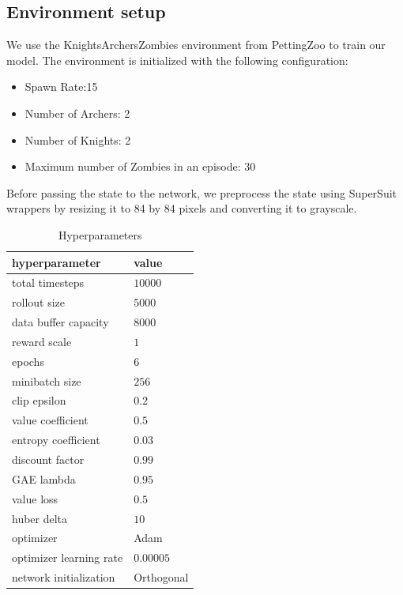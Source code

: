 \documentclass{article}
\begin{document}

\subsection{Environment setup}
We use the KnightsArchersZombies environment from PettingZoo to train our model. The environment is initialized with
the following configuration:
\begin{itemize}
  \item Spawn Rate:15
  \item Number of Archers: 2
  \item Number of Knights: 2
  \item Maximum number of Zombies in an episode: 30
\end{itemize}

Before passing the state to the network, we preprocess the state using SuperSuit \cite{SuperSuit} wrappers by resizing it to 84 by 84 pixels and
converting it to grayscale.


\begin{table}[h]
  \caption{Hyperparameters}
   \centering
   \begin{tabular}{ll}
     \toprule
     hyperparameter     & value     \\
     \midrule
     total timesteps & $10000$ \\
     rollout size & $5000$ \\
     data buffer capacity & $8000$ \\
     reward scale & $1$ \\
     epochs & $6$ \\
     minibatch size & $256$ \\
     clip epsilon & $0.2$ \\
     value coefficient & $0.5$ \\
     entropy coefficient & $0.03$ \\
     discount factor & $0.99$ \\
     GAE lambda & $0.95$ \\
     value loss & $0.5$ \\
     huber delta & $10$ \\
     optimizer & Adam \\
     optimizer learning rate & $0.00005$ \\
     network initialization & Orthogonal \\
     \bottomrule
   \end{tabular}
   \label{tab:table}
 \end{table}
\end{document}
